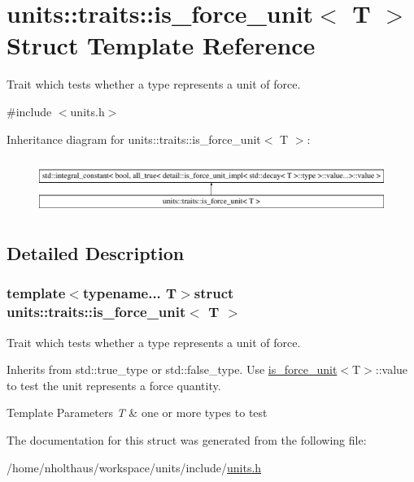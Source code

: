 \hypertarget{structunits_1_1traits_1_1is__force__unit}{}\section{units\+:\+:traits\+:\+:is\+\_\+force\+\_\+unit$<$ T $>$ Struct Template Reference}
\label{structunits_1_1traits_1_1is__force__unit}


Trait which tests whether a type represents a unit of force.  




{\ttfamily \#include $<$units.\+h$>$}

Inheritance diagram for units\+:\+:traits\+:\+:is\+\_\+force\+\_\+unit$<$ T $>$\+:\begin{figure}[H]
\begin{center}
\leavevmode
\includegraphics[height=1.800643cm]{structunits_1_1traits_1_1is__force__unit}
\end{center}
\end{figure}


\subsection{Detailed Description}
\subsubsection*{template$<$typename... T$>$struct units\+::traits\+::is\+\_\+force\+\_\+unit$<$ T $>$}

Trait which tests whether a type represents a unit of force. 

Inherits from {\ttfamily std\+::true\+\_\+type} or {\ttfamily std\+::false\+\_\+type}. Use {\ttfamily \hyperlink{structunits_1_1traits_1_1is__force__unit}{is\+\_\+force\+\_\+unit}$<$T$>$\+::value} to test the unit represents a force quantity. 
\begin{DoxyTemplParams}{Template Parameters}
{\em T} & one or more types to test \\
\hline
\end{DoxyTemplParams}


The documentation for this struct was generated from the following file\+:\begin{DoxyCompactItemize}
\item 
/home/nholthaus/workspace/units/include/\hyperlink{units_8h}{units.\+h}\end{DoxyCompactItemize}
